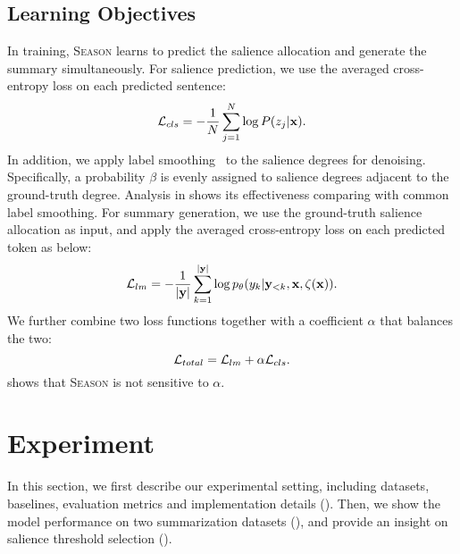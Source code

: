 \documentclass[11pt]{article}
\newcommand{\MODEL}{\mbox{\textsc{Season}}\xspace}
\begin{document}
\subsection{Learning Objectives}
In training, \MODEL learns to predict the salience allocation and generate the summary simultaneously.
For salience prediction, we use the averaged cross-entropy loss on each predicted sentence:
\vspace{-0.1mm}
\begin{equation}
    \mathcal{L}_{cls}= -\frac{1}{N}\sum_{j=1}^{N}{\log{P(z_j|\mathbf{x})}} .
    \label{eq:loss_cls}
    \vspace{-1mm}
\end{equation}
In addition, we apply label smoothing~\cite{diaz2019soft} to the salience degrees for denoising.
Specifically, a probability $\beta$ is evenly assigned to salience degrees adjacent to the ground-truth degree.
Analysis in  shows its effectiveness comparing with common label smoothing.
For summary generation, we use the ground-truth salience allocation as input, and apply the averaged cross-entropy loss on each predicted token as below:
\vspace{-0.1mm}
\begin{equation}
    \mathcal{L}_{lm}= -\frac{1}{|\mathbf{y}|}\sum_{k=1}^{|\mathbf{y}|}{\log{p_{\theta}(y_{k}|\mathbf{y}_{<k}, \mathbf{x}, \mathbf{\zeta}(\mathbf{x}))}} .
    \label{eq:loss_lm}
    \vspace{-1mm}
\end{equation}
We further combine two loss functions together with a coefficient $\alpha$ that balances the two:
\vspace{-0.1mm}
\begin{equation}
    \mathcal{L}_{total} = \mathcal{L}_{lm} + \alpha \mathcal{L}_{cls} .
    \label{eq:loss_total}
    \vspace{-1mm}
\end{equation}
 shows that \MODEL is not sensitive to $\alpha$. 











 \section{Experiment}
In this section, we first describe our experimental setting, including datasets, baselines, evaluation metrics and implementation details ().
Then, we show the model performance on two summarization datasets (), and provide an insight on salience threshold selection ().
\end{document}

